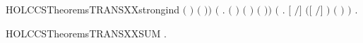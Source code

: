 \begin{SaveVerbatim}{HOLCCSTheoremsTRANSXXstrongind}
             \ensuremath{(}  \ensuremath{)}  \ensuremath{(}  \ensuremath{)}\ensuremath{)} \HOLSymConst{\HOLTokenConj{}}
       \ensuremath{(}\HOLSymConst{\HOLTokenForall{}}   .
             \HOLTokenTransBegin{}\HOLTokenTransEnd {} \HOLSymConst{\HOLTokenConj{}}     \HOLSymConst{\HOLTokenImp{}}
             \ensuremath{(}  \ensuremath{)} \ensuremath{(}  \ensuremath{)} \ensuremath{(}  \ensuremath{)}\ensuremath{)} \HOLSymConst{\HOLTokenConj{}}
       \ensuremath{(}\HOLSymConst{\HOLTokenForall{}}   .
            \ensuremath{[}  \ensuremath{/}\ensuremath{]}  \HOLTokenTransBegin{}\HOLTokenTransEnd {} \HOLSymConst{\HOLTokenConj{}}  \ensuremath{(}\ensuremath{[}  \ensuremath{/}\ensuremath{]} \ensuremath{)}   \HOLSymConst{\HOLTokenImp{}}
             \ensuremath{(}  \ensuremath{)}  \ensuremath{)} \HOLSymConst{\HOLTokenImp{}}
       \HOLSymConst{\HOLTokenForall{}}  .  \HOLTokenTransBegin{}\HOLTokenTransEnd {} \HOLSymConst{\HOLTokenImp{}}    
\end{SaveVerbatim}
\newcommand{\HOLCCSTheoremsTRANSXXstrongind}{\UseVerbatim{HOLCCSTheoremsTRANSXXstrongind}}
\begin{SaveVerbatim}{HOLCCSTheoremsTRANSXXSUM}
\HOLTokenTurnstile{} \HOLSymConst{\HOLTokenForall{}}   .  \HOLSymConst{\ensuremath{+}}  \HOLTokenTransBegin{}\HOLTokenTransEnd {} \HOLSymConst{\HOLTokenImp{}}  \HOLTokenTransBegin{}\HOLTokenTransEnd {} \HOLSymConst{\HOLTokenDisj{}}  \HOLTokenTransBegin{}\HOLTokenTransEnd {}
\end{SaveVerbatim}
